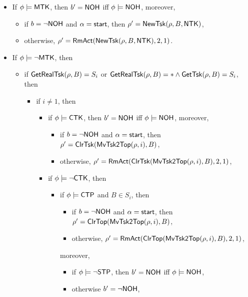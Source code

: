 \begin{itemize}
\item If $\phi \models {\sf MTK}$,  then $b' = {\sf NOH}$ iff $\phi \models {\sf NOH}$, moreover, 
	\begin{itemize}
		\item if $b = \neg {\sf NOH}$ and $\alpha = {\mathsf{start} }$, then $\rho' = \mathsf{NewTsk}(\rho, B, {\sf NTK})$, 
		\item otherwise, $\rho' = \mathsf{RmAct}(\mathsf{NewTsk}(\rho, B, {\sf NTK}), 2, 1)$.
	\end{itemize}
%
\item If $\phi \models \neg {\sf MTK}$,  then
	\begin{itemize}
        \item if $\mathsf{GetRealTsk}(\rho, B) = S_i$ or $\mathsf{GetRealTsk}(\rho,B) = * \wedge\mathsf{GetTsk}(\rho,B) = S_i$, then
        \begin{itemize}
        \item if $i \neq 1$, then 
			\begin{itemize}
				\item if $\phi \models {\sf CTK}$, then $b' = {\sf NOH}$ iff $\phi \models {\sf NOH}$, moreover, 
                \begin{itemize}
					\item if $b = \neg {\sf NOH}$ and $\alpha = {\mathsf{start} }$, then $\rho'=\mathsf{ClrTsk}(\mathsf{MvTsk2Top}(\rho, i), B)$,
					\item otherwise, $\rho' = \mathsf{RmAct}(\mathsf{ClrTsk}(\mathsf{MvTsk2Top}(\rho, i), B), 2, 1)$, 
                \end{itemize}
				\item if $\phi \models \neg {\sf CTK}$, then
					\begin{itemize}
						\item if $\phi \models{\sf CTP}$ and $B \in S_i$, then 
						\begin{itemize}
							\item if $b = \neg {\sf NOH}$ and $\alpha = {\mathsf{start} }$, then $\rho'=\mathsf{ClrTop}(\mathsf{MvTsk2Top}(\rho, i), B)$,
							\item otherwise, $\rho' = \mathsf{RmAct}(\mathsf{ClrTop}(\mathsf{MvTsk2Top}(\rho, i), B), 2, 1)$, 
						\end{itemize}
						moreover, 
						\begin{itemize}
							\item if $\phi\models \neg {\sf STP}$, then $b' = {\sf NOH}$ iff $\phi \models {\sf NOH}$, 
							\item otherwise $b' = \neg {\sf NOH}$, 
						\end{itemize}

\end{itemize}
\end{itemize}
\end{itemize}
\end{itemize}
\end{itemize}

